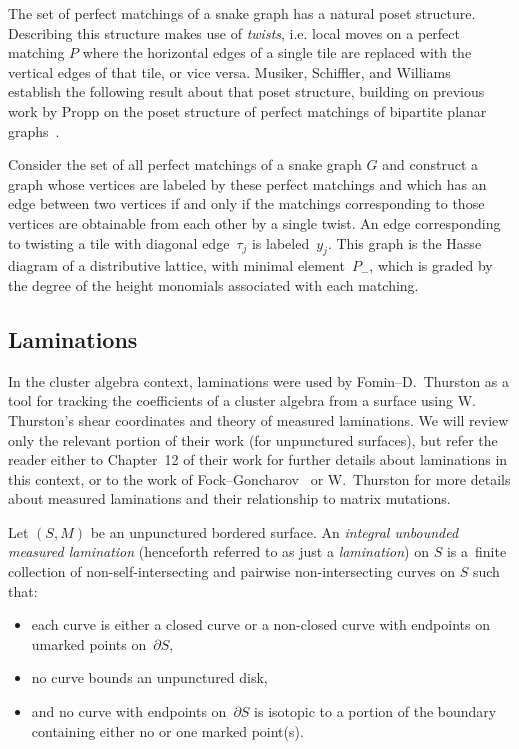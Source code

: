 The set of perfect matchings of a snake graph has a natural poset structure. Describing this structure makes use of \emph{twists}, i.e. local moves on a perfect matching $P$ where the horizontal edges of a single tile are replaced with the vertical edges of that tile, or vice versa. Musiker, Schiffler, and Williams~\cite{MSW-bases} establish the following result about that poset structure, building on previous work by Propp on the poset structure of perfect matchings of bipartite planar graphs~\cite{Propp}.

\begin{Theorem}\label{Thm:PMPoset}
Consider the set of all perfect matchings of a snake graph $G$ and construct a graph whose vertices are labeled by these perfect matchings and which has an edge between two vertices if and only if the matchings corresponding to those vertices are obtainable from each other by a single twist. An edge corresponding to twisting a tile with diagonal edge~$\tau_j$ is labeled~$y_j$. This graph is the Hasse diagram of a distributive lattice, with minimal element~$P_{-}$, which is graded by the degree of the height monomials associated with each matching.
\end{Theorem}

\subsection{Laminations}

In the cluster algebra context, laminations were used by Fomin--D.~Thurston \cite{FT-II} as a tool for tracking the coefficients of a cluster algebra from a surface using W. Thurston's \cite{Thurston2} shear coordinates and theory of measured laminations. We will review only the relevant portion of their work (for unpunctured surfaces), but refer the reader either to Chapter~12 of their work for further details about laminations in this context, or to the work of Fock--Goncharov~\cite{Fock-Goncharov} or W.~Thurston \cite{Thurston2} for more details about measured laminations and their relationship to matrix mutations.

\begin{Definition}[{\cite[Definition~12.1]{FT-II}}]
Let $(S,M)$ be an unpunctured bordered surface. An \emph{integral unbounded measured lamination} (henceforth referred to as just a \emph{lamination}) on $S$ is a~finite collection of non-self-intersecting and pairwise non-intersecting curves on $S$ such that:
\begin{itemize}\itemsep=0pt
 \item each curve is either a closed curve or a non-closed curve with endpoints on umarked points on~$\partial S$,
 \item no curve bounds an unpunctured disk,
 \item and no curve with endpoints on~$\partial S$ is isotopic to a portion of the boundary containing either no or one marked point(s).
\end{itemize}
\end{Definition}

